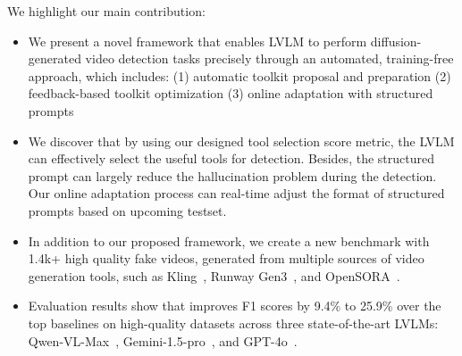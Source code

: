 We highlight our main contribution: 
\begin{itemize}
    \item  We present a novel framework that enables LVLM to perform diffusion-generated video detection tasks precisely through an automated, training-free approach, which includes: (1) automatic toolkit proposal and preparation (2) feedback-based toolkit optimization (3) online adaptation with structured prompts
    \item We discover that by using our designed tool selection score metric, the LVLM can effectively select the useful tools for detection. Besides, the structured prompt can largely reduce the hallucination problem during the detection. Our online adaptation process can real-time adjust the format of structured prompts based on upcoming testset.
    \item In addition to our proposed framework, we create a new benchmark \vidfor with 1.4k+ high quality fake videos, generated from multiple sources of video generation tools, such as Kling~\cite{klingai}, Runway Gen3~\cite{runway3}, and OpenSORA~\cite{opensora}. 
    \item Evaluation results show that \lavid improves F1 scores by 9.4\% to 25.9\% over the top baselines on high-quality datasets across three state-of-the-art LVLMs: Qwen-VL-Max~\cite{qwen2023qwenvl}, Gemini-1.5-pro~\cite{google2024gemini}, and GPT-4o~\cite{openai2024gpt4o}.
\end{itemize}



